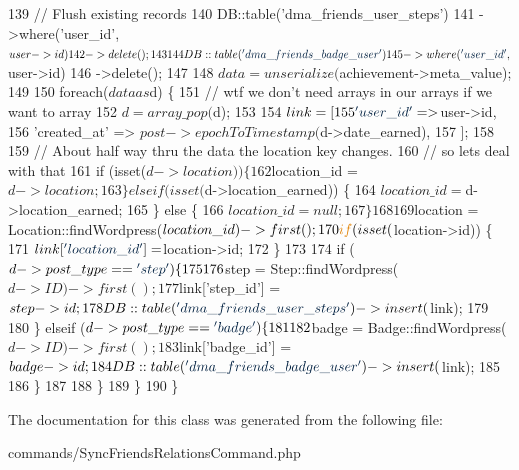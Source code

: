 \begin{DoxyCode}
139             \textcolor{comment}{// Flush existing records}
140             DB::table(\textcolor{stringliteral}{'dma\_friends\_user\_steps'})
141                 ->where(\textcolor{stringliteral}{'user\_id'}, $user->id)
142                 ->delete();
143 
144             DB::table(\textcolor{stringliteral}{'dma\_friends\_badge\_user'})
145                 ->where(\textcolor{stringliteral}{'user\_id'}, $user->id)
146                 ->delete();
147 
148             $data = unserialize($achievement->meta\_value);
149 
150             \textcolor{keywordflow}{foreach}($data as $d) \{
151                 \textcolor{comment}{// wtf we don't need arrays in our arrays if we want to array}
152                 $d = array\_pop($d);
153 
154                 $link = [
155                     \textcolor{stringliteral}{'user\_id'}       => $user->id,
156                     \textcolor{stringliteral}{'created\_at'}    => $post->epochToTimestamp($d->date\_earned),
157                 ];
158 
159                 \textcolor{comment}{// About half way thru the data the location key changes.}
160                 \textcolor{comment}{// so lets deal with that}
161                 \textcolor{keywordflow}{if} (isset($d->location)) \{
162                     $location\_id = $d->location;
163                 \} elseif (isset($d->location\_earned)) \{
164                     $location\_id = $d->location\_earned;
165                 \} \textcolor{keywordflow}{else} \{
166                     $location\_id = null;
167                 \}
168 
169                 $location = Location::findWordpress($location\_id)->first();
170                 \textcolor{keywordflow}{if} (isset($location->id)) \{
171                     $link[\textcolor{stringliteral}{'location\_id'}] = $location->id;
172                 \}
173 
174                 \textcolor{keywordflow}{if} ($d->post\_type == \textcolor{stringliteral}{'step'}) \{
175 
176                     $step = Step::findWordpress($d->ID)->first();
177                     $link[\textcolor{stringliteral}{'step\_id'}] = $step->id;
178                     DB::table(\textcolor{stringliteral}{'dma\_friends\_user\_steps'})->insert($link);
179 
180                 \} elseif ($d->post\_type == \textcolor{stringliteral}{'badge'}) \{
181 
182                     $badge = Badge::findWordpress($d->ID)->first();
183                     $link[\textcolor{stringliteral}{'badge\_id'}] = $badge->id;
184                     DB::table(\textcolor{stringliteral}{'dma\_friends\_badge\_user'})->insert($link);
185 
186                 \}
187         
188             \}
189         \}
190     \}
\end{DoxyCode}


The documentation for this class was generated from the following file\-:\begin{DoxyCompactItemize}
\item 
commands/Sync\-Friends\-Relations\-Command.\-php\end{DoxyCompactItemize}
